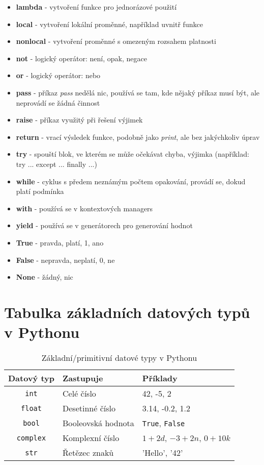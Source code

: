 \documentclass[12pt,a4paper]{article}
\begin{document}
\begin{itemize}
    \item \textbf{lambda} - vytvoření funkce pro jednorázové použití
    \item \textbf{local} - vytvoření lokální proměnné, například uvnitř funkce
    \item \textbf{nonlocal} - vytvoření proměnné s omezeným rozsahem platnosti
    \item \textbf{not} - logický operátor: není, opak, negace
    \item \textbf{or} - logický operátor: nebo
    \item \textbf{pass} - příkaz \textit{pass} nedělá nic, používá se tam, kde nějaký příkaz musí být, ale neprovádí se žádná činnost
    \item \textbf{raise} - příkaz využitý při řešení výjimek
    \item \textbf{return} - vrací výsledek funkce, podobně jako \textit{print}, ale bez jakýchkoliv úprav
    \item \textbf{try} - spouští blok, ve kterém se může očekávat chyba, výjimka (například: try ... except ... finally ...)
    \item \textbf{while} - cyklus s předem neznámým počtem opakování, provádí se, dokud platí podmínka
    \item \textbf{with} - používá se v kontextových managers
    \item \textbf{yield} - používá se v generátorech pro generování hodnot
    \item \textbf{True} - pravda, platí, 1, ano
    \item \textbf{False} - nepravda, neplatí, 0, ne
    \item \textbf{None} - žádný, nic
\end{itemize}
\section{Tabulka základních datových typů v Pythonu}
\begin{table}[htbp]
\centering
\caption{Základní/primitivní datové typy v Pythonu}
\label{tab:python-datatypes}
\begin{tabularx}{\textwidth}{|c|X|X|}
\hline
\textbf{Datový typ} & \textbf{Zastupuje} & \textbf{Příklady} \\
\hline
\texttt{int} & Celé číslo & 42, -5, 2 \\
\hline
\texttt{float} & Desetinné číslo & 3.14, -0.2, 1.2 \\
\hline
\texttt{bool} & Booleovská hodnota & \texttt{True}, \texttt{False} \\
\hline
\texttt{complex} & Komplexní číslo & $1 + 2d$, $-3 + 2n$, $0 + 10k$ \\
\hline
\texttt{str} & Řetězec znaků & 'Hello', '42' \\
\hline
\end{tabularx}
\end{table}
\end{document}
